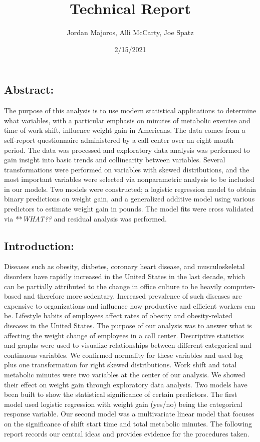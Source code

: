\documentclass[]{article}
\title{Technical Report}
\author{Jordan Majoros, Alli McCarty, Joe Spatz}
\date{2/15/2021}
\begin{document}
\maketitle

\hypertarget{abstract}{%
\subsection{Abstract:}\label{abstract}}

The purpose of this analysis is to use modern statistical applications
to determine what variables, with a particular emphasis on minutes of
metabolic exercise and time of work shift, influence weight gain in
Americans. The data comes from a self-report questionnaire administered
by a call center over an eight month period. The data was processed and
exploratory data analysis was performed to gain insight into basic
trends and collinearity between variables. Several transformations were
performed on variables with skewed distributions, and the most important
variables were selected via nonparametric analysis to be included in our
models. Two models were constructed; a logistic regression model to
obtain binary predictions on weight gain, and a generalized additive
model using various predictors to estimate weight gain in pounds. The
model fits were cross validated via **\emph{WHAT??} and residual
analysis was performed.

\hypertarget{introduction}{%
\subsection{Introduction:}\label{introduction}}

Diseases such as obesity, diabetes, coronary heart disease, and
musculoskeletal disorders have rapidly increased in the United States in
the last decade, which can be partially attributed to the change in
office culture to be heavily computer-based and therefore more
sedentary. Increased prevalence of such diseases are expensive to
organizations and influence how productive and efficient workers can be.
Lifestyle habits of employees affect rates of obesity and
obesity-related diseases in the United States. The purpose of our
analysis was to answer what is affecting the weight change of employees
in a call center. Descriptive statistics and graphs were used to
visualize relationships between different categorical and continuous
variables. We confirmed normality for these variables and used log plus
one transformation for right skewed distributions. Work shift and total
metabolic minutes were two variables at the center of our analysis. We
showed their effect on weight gain through exploratory data analysis.
Two models have been built to show the statistical significance of
certain predictors. The first model used logistic regression with weight
gain (yes/no) being the categorical response variable. Our second model
was a multivariate linear model that focuses on the significance of
shift start time and total metabolic minutes. The following report
records our central ideas and provides evidence for the procedures
taken.
\end{document}
